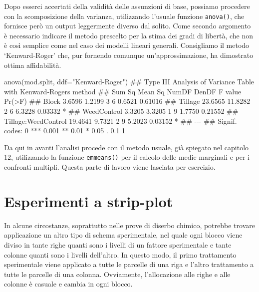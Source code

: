 \documentclass[a4paper,12pt,oneside]{book}
\newenvironment{Shaded}{\begin{snugshade}}{\end{snugshade}}
\newcommand{\StringTok}[1]{#1}
\newcommand{\DocumentationTok}[1]{#1}
\newcommand{\FunctionTok}[1]{#1}
\newcommand{\AttributeTok}[1]{#1}
\newcommand{\NormalTok}[1]{#1}
\begin{document}
Dopo esserci accertati della validità delle assunzioni di base, possiamo procedere con la scomposizione della varianza, utilizzando l'usuale funzione \texttt{anova()}, che fornisce però un output leggermente diverso dal solito. Come secondo argomento è necessario indicare il metodo prescelto per la stima dei gradi di libertà, che non è così semplice come nel caso dei modelli lineari generali. Consigliamo il metodo `Kenward-Roger' che, pur fornendo comunque un'approssimazione, ha dimostrato ottima affidabilità.

\begin{Shaded}
\begin{Highlighting}[]
\FunctionTok{anova}\NormalTok{(mod.split, }\AttributeTok{ddf=}\StringTok{"Kenward{-}Roger"}\NormalTok{)}
\DocumentationTok{\#\# Type III Analysis of Variance Table with Kenward{-}Roger\textquotesingle{}s method}
\DocumentationTok{\#\#                      Sum Sq Mean Sq NumDF DenDF F value  Pr(\textgreater{}F)  }
\DocumentationTok{\#\# Block                3.6596  1.2199     3     6  0.6521 0.61016  }
\DocumentationTok{\#\# Tillage             23.6565 11.8282     2     6  6.3228 0.03332 *}
\DocumentationTok{\#\# WeedControl          3.3205  3.3205     1     9  1.7750 0.21552  }
\DocumentationTok{\#\# Tillage:WeedControl 19.4641  9.7321     2     9  5.2023 0.03152 *}
\DocumentationTok{\#\# {-}{-}{-}}
\DocumentationTok{\#\# Signif. codes:  0 \textquotesingle{}***\textquotesingle{} 0.001 \textquotesingle{}**\textquotesingle{} 0.01 \textquotesingle{}*\textquotesingle{} 0.05 \textquotesingle{}.\textquotesingle{} 0.1 \textquotesingle{} \textquotesingle{} 1}
\end{Highlighting}
\end{Shaded}

Da qui in avanti l'analisi procede con il metodo usuale, già spiegato nel capitolo 12, utilizzando la funzione \texttt{emmeans()} per il calcolo delle medie marginali e per i confronti multipli. Questa parte di lavoro viene lasciata per esercizio.

\hypertarget{esperimenti-a-strip-plot}{%
\section{Esperimenti a strip-plot}\label{esperimenti-a-strip-plot}}

In alcune circostanze, soprattutto nelle prove di diserbo chimico, potrebbe trovare applicazione un altro tipo di schema sperimentale, nel quale ogni blocco viene diviso in tante righe quanti sono i livelli di un fattore sperimentale e tante colonne quanti sono i livelli dell'altro. In questo modo, il primo trattamento sperimentale viene applicato a tutte le parcelle di una riga e l'altro trattamento a tutte le parcelle di una colonna. Ovviamente, l'allocazione alle righe e alle colonne è casuale e cambia in ogni blocco.
\end{document}
